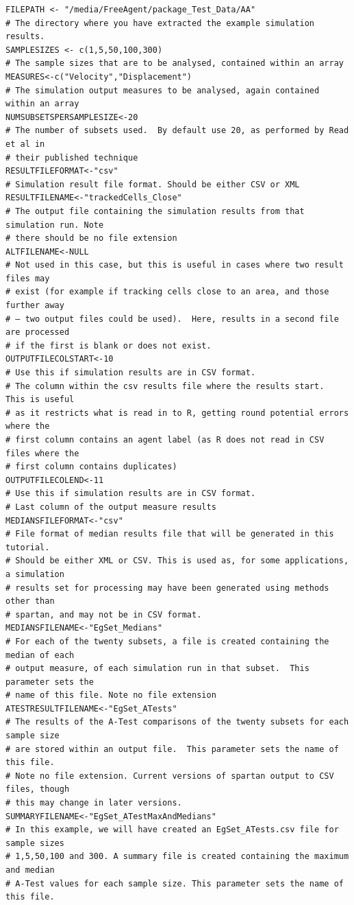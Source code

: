 \documentclass[a4paper,11pt]{article}
\begin{document}
\begin{enumerate}
\begin{verbatim}
FILEPATH <- "/media/FreeAgent/package_Test_Data/AA"
# The directory where you have extracted the example simulation results.
SAMPLESIZES <- c(1,5,50,100,300)
# The sample sizes that are to be analysed, contained within an array
MEASURES<-c("Velocity","Displacement")
# The simulation output measures to be analysed, again contained within an array
NUMSUBSETSPERSAMPLESIZE<-20
# The number of subsets used.  By default use 20, as performed by Read et al in 
# their published technique
RESULTFILEFORMAT<-"csv"
# Simulation result file format. Should be either CSV or XML
RESULTFILENAME<-"trackedCells_Close"
# The output file containing the simulation results from that simulation run. Note
# there should be no file extension
ALTFILENAME<-NULL
# Not used in this case, but this is useful in cases where two result files may 
# exist (for example if tracking cells close to an area, and those further away 
# – two output files could be used).  Here, results in a second file are processed 
# if the first is blank or does not exist.
OUTPUTFILECOLSTART<-10
# Use this if simulation results are in CSV format. 
# The column within the csv results file where the results start.  This is useful 
# as it restricts what is read in to R, getting round potential errors where the 
# first column contains an agent label (as R does not read in CSV files where the 
# first column contains duplicates)
OUTPUTFILECOLEND<-11
# Use this if simulation results are in CSV format.
# Last column of the output measure results
MEDIANSFILEFORMAT<-"csv"
# File format of median results file that will be generated in this tutorial. 
# Should be either XML or CSV. This is used as, for some applications, a simulation 
# results set for processing may have been generated using methods other than 
# spartan, and may not be in CSV format.
MEDIANSFILENAME<-"EgSet_Medians"
# For each of the twenty subsets, a file is created containing the median of each 
# output measure, of each simulation run in that subset.  This parameter sets the 
# name of this file. Note no file extension
ATESTRESULTFILENAME<-"EgSet_ATests"
# The results of the A-Test comparisons of the twenty subsets for each sample size 
# are stored within an output file.  This parameter sets the name of this file. 
# Note no file extension. Current versions of spartan output to CSV files, though 
# this may change in later versions.
SUMMARYFILENAME<-"EgSet_ATestMaxAndMedians"
# In this example, we will have created an EgSet_ATests.csv file for sample sizes 
# 1,5,50,100 and 300. A summary file is created containing the maximum and median 
# A-Test values for each sample size. This parameter sets the name of this file. 

\end{verbatim}
\end{enumerate}
\end{document}

